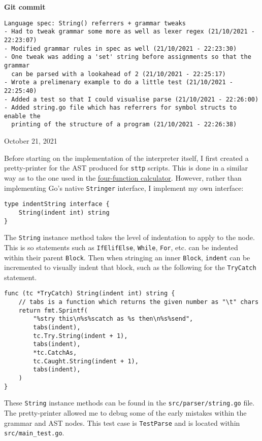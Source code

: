 \begin{center}
    \textbf{Git commit}
    \begin{verbatim}
Language spec: String() referrers + grammar tweaks
- Had to tweak grammar some more as well as lexer regex (21/10/2021 - 22:23:07)
- Modified grammar rules in spec as well (21/10/2021 - 22:23:30)
- One tweak was adding a 'set' string before assignments so that the grammar
  can be parsed with a lookahead of 2 (21/10/2021 - 22:25:17)
- Wrote a prelimenary example to do a little test (21/10/2021 - 22:25:40)
- Added a test so that I could visualise parse (21/10/2021 - 22:26:00)
- Added string.go file which has referrers for symbol structs to enable the
  printing of the structure of a program (21/10/2021 - 22:26:38)
    \end{verbatim}
    \vspace{-1em}
    \tiny{October 21, 2021}
\end{center}

Before starting on the implementation of the interpreter itself, I first created a pretty-printer for the AST produced for \verb|sttp| scripts. This is done in a similar way as to the one used in the \hyperref[sec:four-function-calc]{four-function calculator}. However, rather than implementing Go's native \verb|Stringer| interface, I implement my own interface:

\begin{verbatim}
type indentString interface {
    String(indent int) string
}
\end{verbatim}

The \verb|String| instance method takes the level of indentation to apply to the node. This is so statements such as \verb|IfElifElse|, \verb|While|, \verb|For|, etc. can be indented within their parent \verb|Block|. Then when stringing an inner \verb|Block|, \verb|indent| can be incremented to visually indent that block, such as the following for the \verb|TryCatch| statement.

\begin{verbatim}
func (tc *TryCatch) String(indent int) string {
    // tabs is a function which returns the given number as "\t" chars
    return fmt.Sprintf(
        "%stry this\n%s%scatch as %s then\n%s%send",
        tabs(indent),
        tc.Try.String(indent + 1),
        tabs(indent),
        *tc.CatchAs,
        tc.Caught.String(indent + 1),
        tabs(indent),
    )
}
\end{verbatim}

These \verb|String| instance methods can be found in the \verb|src/parser/string.go| file. The pretty-printer allowed me to debug some of the early mistakes within the grammar and AST nodes. This test case is \verb|TestParse| and is located within \verb|src/main_test.go|.

